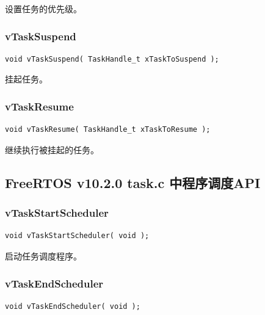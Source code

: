 \documentclass[12pt, a4paper]{article}
\begin{document}
设置任务的优先级。

\subsubsection {vTaskSuspend}

\begin{lstlisting}[language={[ANSI]C},keywordstyle=\color{blue!70},commentstyle=\color{red!50!green!50!blue!50},frame=shadowbox, rulesepcolor=\color{red!20!green!20!blue!20}]
void vTaskSuspend( TaskHandle_t xTaskToSuspend );
\end{lstlisting}

挂起任务。

\subsubsection {vTaskResume}

\begin{lstlisting}[language={[ANSI]C},keywordstyle=\color{blue!70},commentstyle=\color{red!50!green!50!blue!50},frame=shadowbox, rulesepcolor=\color{red!20!green!20!blue!20}]
void vTaskResume( TaskHandle_t xTaskToResume );
\end{lstlisting}

继续执行被挂起的任务。

\subsection {FreeRTOS v10.2.0 task.c 中程序调度API}

\subsubsection {vTaskStartScheduler}

\begin{lstlisting}[language={[ANSI]C},keywordstyle=\color{blue!70},commentstyle=\color{red!50!green!50!blue!50},frame=shadowbox, rulesepcolor=\color{red!20!green!20!blue!20}]
void vTaskStartScheduler( void );
\end{lstlisting}

启动任务调度程序。

\subsubsection {vTaskEndScheduler}

\begin{lstlisting}[language={[ANSI]C},keywordstyle=\color{blue!70},commentstyle=\color{red!50!green!50!blue!50},frame=shadowbox, rulesepcolor=\color{red!20!green!20!blue!20}]
void vTaskEndScheduler( void );
\end{lstlisting}
\end{document}
